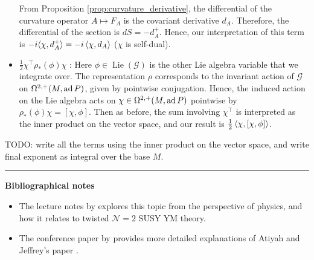\begin{itemize}[leftmargin=\parindent]
From Proposition \ref{prop:curvature_derivative}, the
differential of the curvature operator $A \mapsto F_A$ is the covariant
derivative  $d_A$. Therefore, the differential of the section is $dS = -d_A^+$.
Hence, our interpretation of this term is $-i\gen[*]{\chi,d_A^+} =
-i\gen{\chi,d_A}$ ($\chi$ is self-dual).

	\item 
$\frac{1}{2}\chi^\intercal \rho_*(\phi)\chi$ :
Here $\phi \in \operatorname{Lie}(\mathcal{G})$ is the other Lie algebra 
variable that we integrate over. The representation $\rho$ corresponds to the
invariant action of $\mathcal{G}$ on $\Omega^{2,+}(M,\operatorname{ad} P)$, given by pointwise
conjugation. Hence, the induced action on the Lie algebra acts on $\chi\in
\Omega^{2,+}(M,\operatorname{ad} P)$ pointwise by $\rho_*(\phi) \chi = [\chi,\phi]$. 
Then as before, the sum involving  $\chi^\intercal$ is interpreted as the inner
product on the vector space, and our result is  $\frac{1}{2} \gen{\chi,
[\chi,\phi]}$. 


\end{itemize}

TODO: write all the terms using the inner product on the vector space, and write
final exponent as integral over the base $M$. 

\vspace{5mm}
\hrule 
\vspace{5mm}

\textbf{Bibliographical notes}
{\small
\begin{itemize}
	\item The lecture notes by \citet{cordes95} explores this topic from the
	perspective of physics, and how it relates to twisted 
	$\mathcal{N}=2$ SUSY YM theory.
	\item The conference paper by \citet{naber} provides more detailed
	explanations of Atiyah and Jeffrey's paper \cite{atiyahlagrangians}.
\end{itemize}
}


